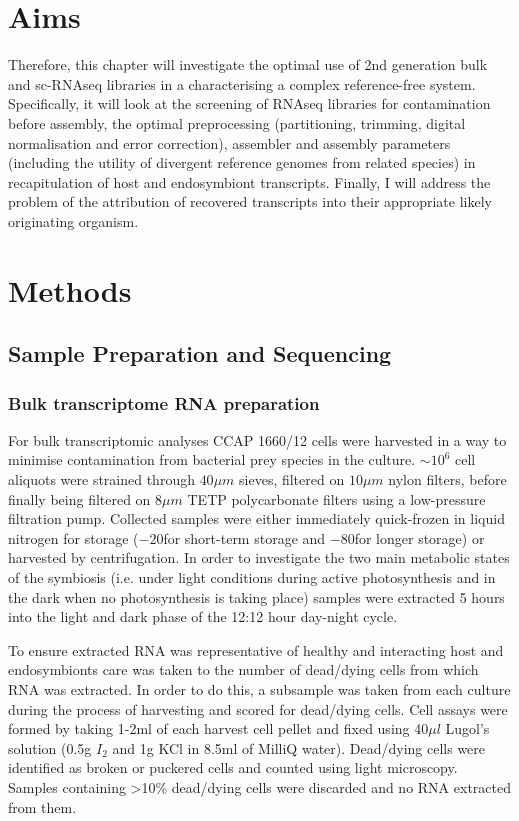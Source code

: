 \section{Aims}
Therefore, this chapter will investigate the optimal use of 2nd generation bulk and sc-RNAseq libraries
in a characterising a complex reference-free system.  Specifically, it will look at the screening of RNAseq libraries for contamination
before assembly, the optimal preprocessing (partitioning, trimming, digital normalisation and error correction), assembler and assembly
parameters (including the utility of divergent reference genomes from related species) in recapitulation of host and endosymbiont transcripts.
Finally, I will address the problem of the attribution of recovered transcripts into their appropriate likely originating organism.  
\section{Methods} 

\subsection{Sample Preparation and Sequencing}

\subsubsection{Bulk transcriptome RNA preparation}
For bulk transcriptomic analyses CCAP 1660/12 cells were harvested in a way to minimise 
contamination from bacterial prey species in the culture. \(\sim 10^{6}\) 
cell aliquots were strained through \(40\mu m\) sieves, filtered on 
\(10 \mu m\) nylon filters, 
before finally being filtered on \(8 \mu m\) TETP polycarbonate filters using a 
low-pressure filtration pump.  Collected samples were either immediately 
quick-frozen in liquid nitrogen for storage (\(-20\)\celsius for short-term storage 
and \(-80\)\celsius for longer storage) or harvested by centrifugation.  
In order to investigate the two main metabolic states of the symbiosis 
(i.e. under light conditions during active photosynthesis and in the dark 
when no photosynthesis is taking place) samples were extracted 5 hours into 
the light and dark phase of the 12:12 hour day-night cycle.

To ensure extracted RNA was representative of healthy and interacting host 
and endosymbionts care was taken to the number of dead/dying cells 
from which RNA was extracted.  In order to do this, a subsample was taken 
from each culture during the process of harvesting and scored for dead/dying cells.  
Cell assays were formed by taking 1-2ml of each harvest cell pellet and 
fixed using 40\(\mu l\) Lugol's solution (0.5g \(I_{2}\) and 1g KCl in 8.5ml 
of MilliQ water). Dead/dying cells were identified as broken or puckered cells 
and counted using light microscopy.  Samples containing >10\% dead/dying cells 
were discarded and no RNA extracted from them.

